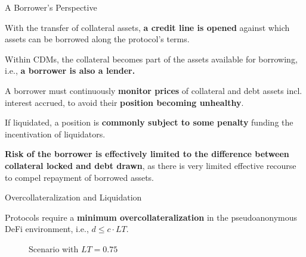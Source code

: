\documentclass[]{beamer}
\begin{document}
\begin{frame}{A Borrower's Perspective}

With the transfer of collateral assets, \textbf{a credit line is opened }against which assets can be borrowed along the protocol’s terms.

\vspace{1 em}
Within CDMs, the collateral becomes part of the assets available for borrowing, i.e., \textbf{a borrower is also a lender.}

 {
\vspace{1 em}
A borrower must continuously \textbf{monitor prices} of collateral and debt assets incl. interest accrued, to avoid their \textbf{position becoming unhealthy}.

\vspace{1 em}
If liquidated, a position is \textbf{commonly subject to some penalty} funding the incentivation of liquidators.
}

 {
\vspace{1 em}
\textbf{Risk of the borrower is effectively limited to the difference between collateral locked and debt drawn}, as there is very limited effective recourse to compel repayment of borrowed assets. 
}
	
\end{frame}


\begin{frame}{Overcollateralization and Liquidation}

Protocols require a \textbf{minimum overcollateralization} in the pseudoanonymous DeFi environment, i.e., $d \leq c \cdot LT$.
\vspace{1em}

\begin{minipage}{0.6\textwidth}
	\vspace{1.5em}
	\begin{figure}[t]
		\centering
			\begin{tikzpicture}[scale=0.5, every node/.style={scale=0.8}]
			
		\end{tikzpicture}
		\caption{Scenario with $LT = 0.75$}
	\end{figure}
\end{minipage}
\begin{minipage}{0.38\textwidth}
	
	
	\vspace{1em}
\end{minipage}
	
\end{frame}
\end{document}
